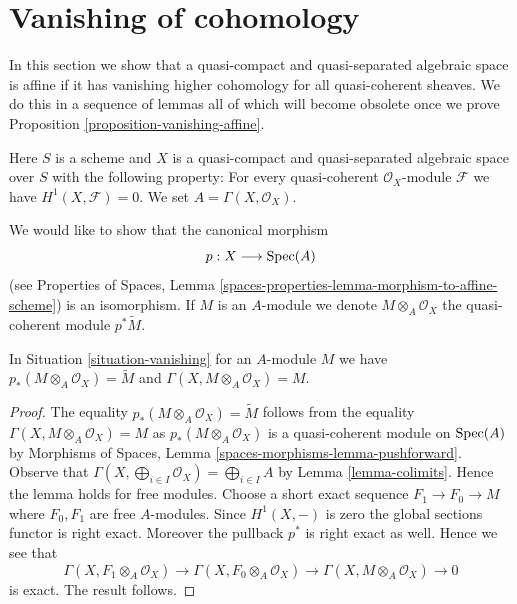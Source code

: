 \section{Vanishing of cohomology}
\label{section-vanishing}

\noindent
In this section we show that a quasi-compact and quasi-separated
algebraic space is affine if it has vanishing higher cohomology
for all quasi-coherent sheaves. We do this in a sequence of lemmas
all of which will become obsolete once we prove
Proposition \ref{proposition-vanishing-affine}.

\begin{situation}
\label{situation-vanishing}
Here $S$ is a scheme and $X$ is a quasi-compact and quasi-separated
algebraic space over $S$ with the following property: For every
quasi-coherent $\mathcal{O}_X$-module $\mathcal{F}$ we have
$H^1(X, \mathcal{F}) = 0$. We set $A = \Gamma(X, \mathcal{O}_X)$.
\end{situation}

\noindent
We would like to show that the canonical morphism
$$
p : X \longrightarrow \mathop{\mathrm{Spec}}(A)
$$
(see Properties of Spaces, Lemma
\ref{spaces-properties-lemma-morphism-to-affine-scheme}) is an isomorphism.
If $M$ is an $A$-module we denote $M \otimes_A \mathcal{O}_X$
the quasi-coherent module $p^*\tilde M$.

\begin{lemma}
\label{lemma-vanishing-compute}
In Situation \ref{situation-vanishing} for an $A$-module $M$ we have
$p_*(M \otimes_A \mathcal{O}_X) = \widetilde{M}$ and
$\Gamma(X, M \otimes_A \mathcal{O}_X) = M$.
\end{lemma}

\begin{proof}
The equality $p_*(M \otimes_A \mathcal{O}_X) = \widetilde{M}$ follows
from the equality $\Gamma(X, M \otimes_A \mathcal{O}_X) = M$ as
$p_*(M \otimes_A \mathcal{O}_X)$ is a quasi-coherent module on
$\mathop{\mathrm{Spec}}(A)$ by Morphisms of Spaces, Lemma
\ref{spaces-morphisms-lemma-pushforward}.
Observe that $\Gamma(X, \bigoplus_{i \in I} \mathcal{O}_X) =
\bigoplus_{i \in I} A$ by Lemma \ref{lemma-colimits}. Hence the
lemma holds for free modules. Choose a short exact sequence
$F_1 \to F_0 \to M$ where $F_0, F_1$ are free $A$-modules. Since
$H^1(X, -)$ is zero the global sections functor is right exact.
Moreover the pullback $p^*$ is right exact as well. Hence we see
that
$$
\Gamma(X, F_1 \otimes_A \mathcal{O}_X) \to
\Gamma(X, F_0 \otimes_A \mathcal{O}_X) \to
\Gamma(X, M \otimes_A \mathcal{O}_X) \to 0
$$
is exact. The result follows.
\end{proof}

